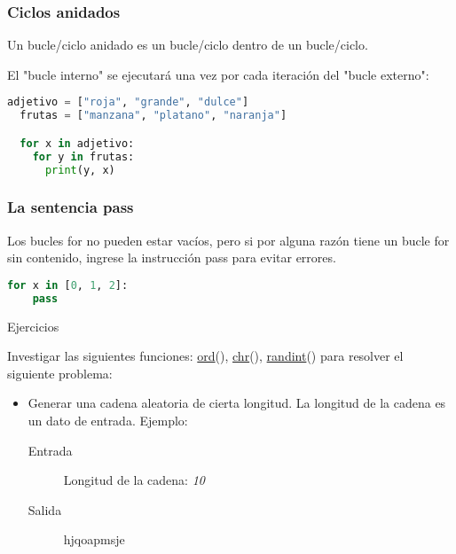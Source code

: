 \begin{frame}[fragile]
  \frametitle{Ciclos anidados}

  Un bucle/ciclo anidado es un bucle/ciclo dentro de un bucle/ciclo.

  \vspace{\baselineskip}
  El "bucle interno" se ejecutará una vez por cada iteración del
  "bucle externo":

  \vspace{\baselineskip}
  \begin{lstlisting}[language=Python]
  adjetivo = ["roja", "grande", "dulce"]
  frutas = ["manzana", "platano", "naranja"]

  for x in adjetivo:
    for y in frutas:
      print(y, x)
  \end{lstlisting}
\end{frame}

\begin{frame}[fragile]
  \frametitle{La sentencia \textbf{pass}}

  Los bucles for no pueden estar vacíos, pero si por alguna
  razón tiene un bucle for sin contenido, ingrese la instrucción
  pass para evitar errores.

  \vspace{\baselineskip}
  \begin{lstlisting}[language=Python]
  for x in [0, 1, 2]:
    pass
  \end{lstlisting}
\end{frame}

\begin{frame}[c]{Ejercicios}

  Investigar las siguientes funciones:
  \href{https://www.w3schools.com/python/ref_func_ord.asp}{ord}(),
  \href{https://www.w3schools.com/python/ref_func_chr.asp}{chr}(),
  \href{https://www.w3schools.com/python/ref_random_randint.asp}{randint}()
  para resolver el siguiente problema:

  \vspace{\baselineskip}
  \begin{itemize}
    \item Generar una cadena aleatoria de cierta longitud. La longitud de la
      cadena es un dato de entrada.
      \vspace{\baselineskip}
      Ejemplo:
      \vspace{\baselineskip}
      \begin{description}
        \item[Entrada] Longitud de la cadena: \emph{10}
        \vspace{\baselineskip}
        \item[Salida] hjqoapmsje
      \end{description}
  \end{itemize}
\end{frame}
